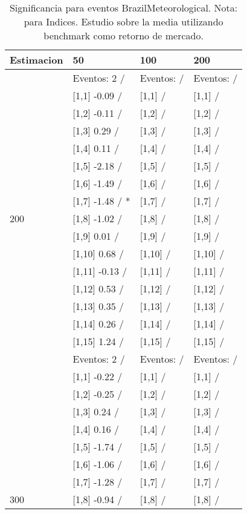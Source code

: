 \begin{table}

\caption{Significancia para eventos BrazilMeteorological. Nota: para Indices. Estudio sobre la media utilizando benchmark como retorno de mercado.}
\centering
\begin{tabular}[t]{llll}
\toprule
Estimacion & 50 & 100 & 200\\
\midrule
 & Eventos:  2 / & Eventos:   / & Eventos:   /\\
 & {}[1,1] -0.09  / & {}[1,1]  / & {}[1,1]  /\\
 & {}[1,2] -0.11  / & {}[1,2]  / & {}[1,2]  /\\
 & {}[1,3] 0.29  / & {}[1,3]  / & {}[1,3]  /\\
 & {}[1,4] 0.11  / & {}[1,4]  / & {}[1,4]  /\\
\addlinespace
 & {}[1,5] -2.18  / & {}[1,5]  / & {}[1,5]  /\\
 & {}[1,6] -1.49  / & {}[1,6]  / & {}[1,6]  /\\
 & {}[1,7] -1.48  / * & {}[1,7]  / & {}[1,7]  /\\
200 & {}[1,8] -1.02  / & {}[1,8]  / & {}[1,8]  /\\
 & {}[1,9] 0.01  / & {}[1,9]  / & {}[1,9]  /\\
\addlinespace
 & {}[1,10] 0.68  / & {}[1,10]  / & {}[1,10]  /\\
 & {}[1,11] -0.13  / & {}[1,11]  / & {}[1,11]  /\\
 & {}[1,12] 0.53  / & {}[1,12]  / & {}[1,12]  /\\
 & {}[1,13] 0.35  / & {}[1,13]  / & {}[1,13]  /\\
 & {}[1,14] 0.26  / & {}[1,14]  / & {}[1,14]  /\\
\addlinespace
 & {}[1,15] 1.24  / & {}[1,15]  / & {}[1,15]  /\\
 & Eventos:  2 / & Eventos:   / & Eventos:   /\\
 & {}[1,1] -0.22  / & {}[1,1]  / & {}[1,1]  /\\
 & {}[1,2] -0.25  / & {}[1,2]  / & {}[1,2]  /\\
 & {}[1,3] 0.24  / & {}[1,3]  / & {}[1,3]  /\\
\addlinespace
 & {}[1,4] 0.16  / & {}[1,4]  / & {}[1,4]  /\\
 & {}[1,5] -1.74  / & {}[1,5]  / & {}[1,5]  /\\
 & {}[1,6] -1.06  / & {}[1,6]  / & {}[1,6]  /\\
 & {}[1,7] -1.28  / & {}[1,7]  / & {}[1,7]  /\\
300 & {}[1,8] -0.94  / & {}[1,8]  / & {}[1,8]  /\\

\end{tabular}
\end{table}
